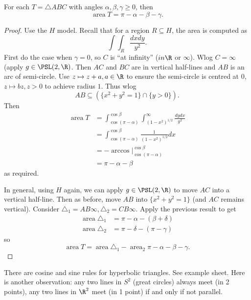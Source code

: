 \documentclass[a4paper]{article}
\theoremstyle{definition}
\begin{document}
\begin{theorem}
  For each \(T = \triangle ABC\) with angles \(\alpha, \beta, \gamma \geq 0\), then
  \[
    \operatorname{area} T = \pi - \alpha - \beta - \gamma.
  \]
\end{theorem}

\begin{proof}
  Use the \(H\) model. Recall that for a region \(R \subseteq H\), the area is computed as
  \[
    \int\int_R \frac{dxdy}{y^2}.
  \]
  First do the case when \(\gamma = 0\), so \(C\) is ``at infinity'' (\(in\R\) or \(\infty\)). Wlog \(C = \infty\) (apply \(g \in \PSL(2, \R)\). Then \(AC\) and \(BC\) are in vertical half-lines and \(AB\) is an arc of semi-circle. Use \(z \mapsto z + a, a \in \R\) to ensure the semi-circle is centred at \(0\), \(z \mapsto bz, z > 0\) to achieve radius \(1\). Thus wlog
  \[
    AB \subseteq (\{x^2 + y^2 = 1\} \cap \{y > 0\}).
  \]
  Then
  \begin{align*}
    \operatorname{area} T
    &= \int_{\cos(\pi - \alpha)}^{\cos \beta} \int_{(1 - x^2)^{1/2}}^\infty \frac{dydx}{y^2} \\
    &= \int_{\cos (\pi - \alpha)}^{\cos \beta} \frac{1}{(1 - x^2)^{1/2}}dx \\
    &= -\arccos \Big|_{\cos (\pi - \alpha)}^{\cos \beta} \\
    &= \pi - \alpha - \beta
  \end{align*}
  as required.

  In general, using \(H\) again, we can apply \(g \in \PSL(2, \R)\) to move \(AC\) into a vertical half-line. Then as before, move \(AB\) into \(\{x^2 + y^2 = 1\}\) (and \(AC\) remains vertical). Consider \(\triangle_1 = AB\infty, \triangle_2 = CB\infty\). Apply the previous result to get
  \begin{align*}
    \operatorname{area} \triangle_1 &= \pi - \alpha - (\beta + \delta) \\
    \operatorname{area} \triangle_2 &= \pi - \delta - (\pi - \gamma)
  \end{align*}
  so
  \[
    \operatorname{area} T = \operatorname{area} \triangle_1 - \operatorname{area}_2 \pi - \alpha - \beta - \gamma.
  \]
\end{proof}

There are cosine and sine rules for hyperbolic triangles. See example sheet. Here is another observation: any two lines in \(S^2\) (great circles) always meet (in 2 points), any two lines in \(\R^2\) meet (in 1 point) if and only if not parallel.
\end{document}
